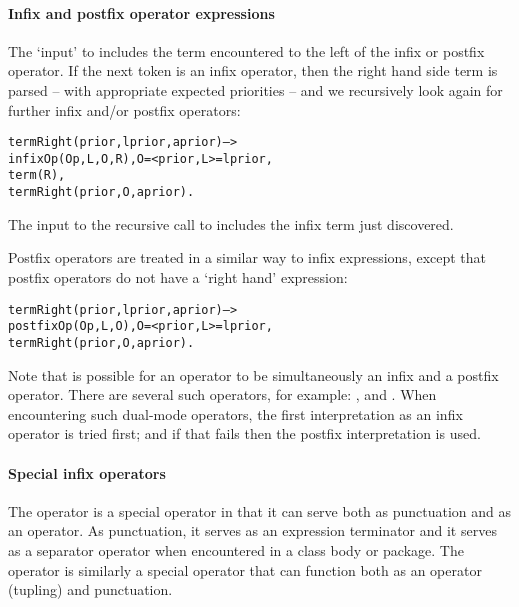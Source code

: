 \paragraph{Infix and postfix operator expressions}
The `input' to  includes the term encountered to the left of the infix or postfix operator. If the next token is an infix operator, then the right hand side term is parsed -- with appropriate expected priorities -- and we recursively look again for further infix and/or postfix operators:
\begin{alltt}
termRight(prior,lprior,aprior) -->
	infixOp(Op,L,O,R),O=<prior,L>=lprior,
    term(R),
    termRight(prior,O,aprior).
\end{alltt}
The input to the recursive call to  includes the infix term just discovered. 

Postfix operators are treated in a similar way to infix expressions, except that postfix operators do not have a `right hand' expression:
\begin{alltt}
termRight(prior,lprior,aprior) -->
    postfixOp(Op,L,O),O=<prior,L>=lprior,
    termRight(prior,O,aprior).
\end{alltt}
Note that is possible for an operator to be simultaneously an infix and a postfix operator. There are several such operators, for example: \function{\dotspace}, \q{+} and \q{\uphat}. When encountering such dual-mode operators, the first interpretation as an infix operator is tried first; and if that fails then the postfix interpretation is used.

\paragraph{Special infix operators}     
The \q{\dotspace} operator is a special operator in that it can serve both as punctuation and as an operator. As punctuation, it serves as an expression terminator and it serves as a separator operator when encountered in a class body or package. The  operator is similarly a special operator that can function both as an operator (tupling) and punctuation.
